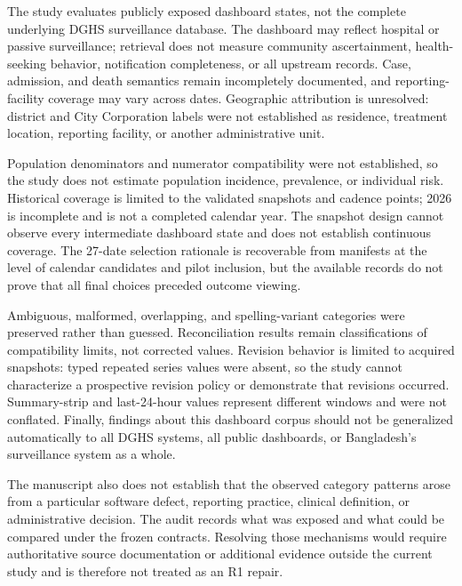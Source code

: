 The study evaluates publicly exposed dashboard states, not the complete underlying DGHS surveillance database. The dashboard may reflect hospital or passive surveillance; retrieval does not measure community ascertainment, health-seeking behavior, notification completeness, or all upstream records. Case, admission, and death semantics remain incompletely documented, and reporting-facility coverage may vary across dates. Geographic attribution is unresolved: district and City Corporation labels were not established as residence, treatment location, reporting facility, or another administrative unit.

Population denominators and numerator compatibility were not established, so the study does not estimate population incidence, prevalence, or individual risk. Historical coverage is limited to the validated snapshots and cadence points; 2026 is incomplete and is not a completed calendar year. The snapshot design cannot observe every intermediate dashboard state and does not establish continuous coverage. The 27-date selection rationale is recoverable from manifests at the level of calendar candidates and pilot inclusion, but the available records do not prove that all final choices preceded outcome viewing.

Ambiguous, malformed, overlapping, and spelling-variant categories were preserved rather than guessed. Reconciliation results remain classifications of compatibility limits, not corrected values. Revision behavior is limited to acquired snapshots: typed repeated series values were absent, so the study cannot characterize a prospective revision policy or demonstrate that revisions occurred. Summary-strip and last-24-hour values represent different windows and were not conflated. Finally, findings about this dashboard corpus should not be generalized automatically to all DGHS systems, all public dashboards, or Bangladesh's surveillance system as a whole.

The manuscript also does not establish that the observed category patterns arose from a particular software defect, reporting practice, clinical definition, or administrative decision. The audit records what was exposed and what could be compared under the frozen contracts. Resolving those mechanisms would require authoritative source documentation or additional evidence outside the current study and is therefore not treated as an R1 repair.
